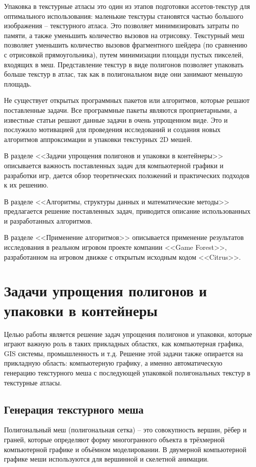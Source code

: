 \documentclass{fefu_thesis/cls/fefu}
\begin{document}
    Упаковка в текстурные атласы это один из этапов подготовки ассетов-текстур для оптимального использования: маленькие текстуры становятся частью большого изображения -- текстурного атласа. Это позволяет минимизировать затраты по памяти, а также уменьшить количество вызовов на отрисовку. Текстурный меш позволяет уменьшить количество вызовов фрагментного шейдера (по сравнению с отрисовкой прямоугольника), путем минимизации площади пустых пикселей, входящих в меш. Представление текстур в виде полигонов позволяет упаковать больше текстур в атлас, так как в полигональном виде они занимают меньшую площадь.

    Не существует открытых программных пакетов или алгоритмов, которые решают поставленные задачи. Все программные пакеты являются проприетарными, а известные статьи решают данные задачи в очень упрощенном виде. Это и послужило мотивацией для проведения исследований и создания новых алгоритмов аппроксимации и упаковки текстурных 2D мешей.

    В разделе <<Задачи упрощения полигонов и упаковки в контейнеры>> описывается важность поставленных задач для компьютерной графики и разработки игр, дается обзор теоретических положений и практических подходов к их решению.

    В разделе <<Алгоритмы, структуры данных и математические методы>> предлагается решение поставленных задач, приводится описание использованных и разработанных алгоритмов.

    В разделе <<Применение алгоритмов>> описывается применение результатов исследования в реальном игровом проекте компании <<Game Forest>>, разработанном на игровом движке с открытым исходным кодом <<Citrus>>.

    \pagebreak
    \section{Задачи упрощения полигонов и упаковки в контейнеры}

    Целью работы является решение задач упрощения полигонов и упаковки, которые играют важную роль в таких прикладных областях, как компьютерная графика, GIS системы, промышленность и т.д. Решение этой задачи также опирается на прикладную область: компьютерную графику, а именно автоматическую генерацию текстурного меша с последующей упаковкой полигональных текстур в текстурные атласы.

    \subsection{Генерация текстурного меша}
    \label{TextureMeshGeneration}
    Полигональный меш (полигональная сетка) -- это совокупность вершин, рёбер и граней, которые определяют форму многогранного объекта в трёхмерной компьютерной графике и объёмном моделировании. В двумерной компьютерной графике меши используются для вершинной и скелетной анимации.
\end{document}
